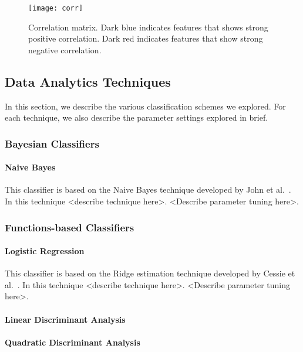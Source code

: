 \begin{figure}[h]
\centering
\texttt{[image: corr]}
\caption{Correlation matrix. Dark blue indicates features that shows strong positive correlation. Dark red indicates features that show strong negative correlation.}
\label{fig:correlation-matrix}
\end{figure}



\subsection{Data Analytics Techniques}

In this section, we describe the various classification schemes we explored. For each technique, we also describe the parameter settings explored in brief.


\subsubsection{Bayesian Classifiers}

\paragraph{Naive Bayes}

This classifier is based on the Naive Bayes technique developed by John et al.~\cite{NaiveBayes}. In this technique <describe technique here>. <Describe parameter tuning here>.

\subsubsection{Functions-based Classifiers}

\paragraph{Logistic Regression}

This classifier is based on the Ridge estimation technique developed by Cessie et al.~\cite{Logistic Regression}. In this technique <describe technique here>. <Describe parameter tuning here>.

\paragraph{Linear Discriminant Analysis}

\paragraph{Quadratic Discriminant Analysis}



